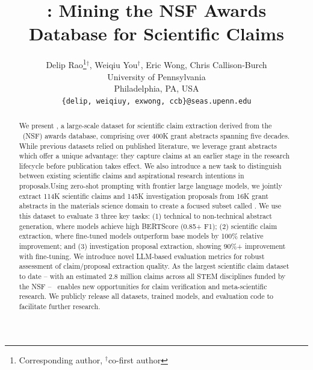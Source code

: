 \documentclass[11pt]{article}
\title{\DatasetName: Mining the NSF Awards Database for Scientific Claims}
\author{Delip Rao\thanks{Corresponding author, $^\dagger$co-first author}$^\dagger$, Weiqiu You$^\dagger$, Eric Wong, Chris Callison-Burch \\
	    University of Pennsylvania \\
        Philadelphia, PA, USA \\
	    {\tt \{delip, weiqiuy, exwong, ccb\}@seas.upenn.edu} }
\begin{document}
\maketitle
\begin{abstract}

We present \DatasetName, a large-scale dataset for scientific claim extraction derived from the \NSF~(NSF) awards database, comprising over 400K grant abstracts spanning five decades. While previous datasets relied on published literature, we leverage grant abstracts which offer a unique advantage: they capture claims at an earlier stage in the research lifecycle before publication takes effect. We also introduce a new task  to distinguish between existing scientific claims and aspirational research intentions in proposals.Using zero-shot prompting with frontier large language models, we jointly extract 114K scientific claims and 145K investigation proposals from 16K grant abstracts in the materials science domain to create a focused subset called \DatasetNameMatSci. We use this dataset to evaluate 3 three key tasks: (1) technical to non-technical abstract generation, where models achieve high BERTScore (0.85+ F1); (2) scientific claim extraction, where fine-tuned models outperform base models by 100\% relative improvement; and (3) investigation proposal extraction, showing 90\%+ improvement with fine-tuning. We introduce novel LLM-based evaluation metrics for robust assessment of claim/proposal extraction quality. As the largest scientific claim dataset to date -- with an estimated 2.8 million claims across all STEM disciplines funded by the NSF -- \DatasetName~enables new opportunities for claim verification and meta-scientific research. We publicly release all datasets, trained models, and evaluation code to facilitate further research.
\end{abstract}
\end{document}
